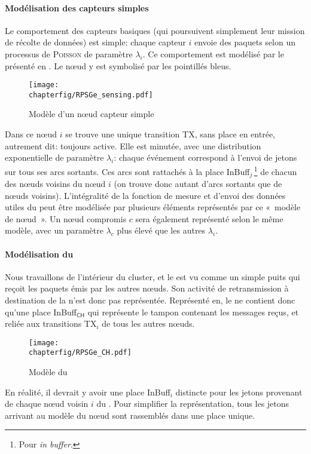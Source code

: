             \paragraph{Modélisation des capteurs simples}
Le comportement des capteurs basiques (qui poursuivent simplement leur mission de récolte de données) est simple: chaque capteur $i$ envoie des paquets selon un processus de \textsc{Poisson} de paramètre $\lambda_i$.
Ce comportement est modélisé par le \rpsg présenté en .
Le nœud y est symbolisé par les pointillés bleus.
\begin{figure}[!ht]
    \centering
    \texttt{[image: \\chapterfig/RPSGe\_sensing.pdf]}
    \caption{Modèle \rpsg d'un nœud capteur simple}\label{sa:fig:snodegspn}
\end{figure}
Dans ce nœud $i$ se trouve une unique transition \textsf{TX}, sans place en entrée, autrement dit: toujours active.
Elle est minutée, avec une distribution exponentielle de paramètre $\lambda_i$: chaque événement correspond à l'envoi de jetons sur tous ses arcs sortants.
Ces arcs sont rattachés à la place \textsf{InBuff$_{j}$}\,\footnote{Pour \textit{in buffer}.} de chacun des nœuds voisins du nœud $i$ (on trouve donc autant d'arcs sortants que de nœuds voisins).
L'intégralité de la fonction de mesure et d'envoi des données utiles du \rc peut être modélisée par plusieurs éléments représentés par ce «~modèle de nœud~».
Un nœud compromis $c$ sera également représenté selon le même modèle, avec un paramètre $\lambda_c$ plus élevé que les autres $\lambda_i$.

            \paragraph{Modélisation du \ch}
Nous travaillons de l'intérieur du cluster, et le \ch est vu comme un simple puits qui reçoit les paquets émis par les autres nœuds.
Son activité de retransmission à destination de la \sdb n'est donc pas représentée.
Représenté en, le \CH ne contient donc qu'une place \textsf{InBuff$_\textsf{CH}$} qui représente le tampon contenant les messages reçus, et reliée aux transitions \textsf{TX$_i$} de tous les autres nœuds.
\begin{figure}[ht]
    \centering
    \texttt{[image: \\chapterfig/RPSGe\_CH.pdf]}
    \caption{Modèle \rpsg du \ch}\label{sa:fig:chgspn}
\end{figure}
En réalité, il devrait y avoir une place \textsf{InBuff$_i$} distincte pour les jetons provenant de chaque nœud voisin $i$ du \ch. Pour simplifier la représentation, tous les jetons arrivant au modèle du nœud sont rassemblés dans une place unique.

